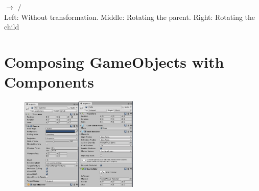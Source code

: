 \documentclass[11pt]{article}
\begin{document}
\begin{center}
\centering \noindent
{} $\rightarrow$
 $\Big/$
 \\
Left: Without transformation.  Middle: Rotating the parent.  Right: Rotating the child
\end{center}

\section{Composing GameObjects with Components}

\begin{figure}
    \centering
    \includegraphics[width=0.25\textwidth]{inspector_camera}\includegraphics[width=0.25\textwidth]{inspector_cube}
\end{figure}
\end{document}
